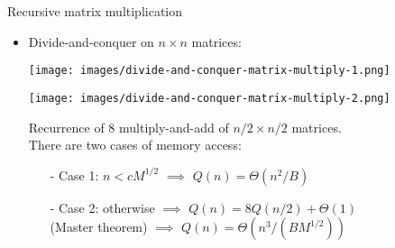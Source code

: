 \documentclass[t,usepdftitle=false]{beamer}
\begin{document}
\begin{frame}{Recursive matrix multiplication}
\begin{itemize}
\item Divide-and-conquer on $n\times n$ matrices:\vspace{.15cm}
\begin{center}\hspace{-1cm}\texttt{[image: images/divide-and-conquer-matrix-multiply-1.png]}\end{center}\vspace{.15cm}
\begin{center}\hspace{2.45cm}\texttt{[image: images/divide-and-conquer-matrix-multiply-2.png]}\end{center}
Recurrence of 8 multiply-and-add of $n/2\times n/2$ matrices.\vspace{.1cm}\\
There are two cases of memory access:
\begin{itemize}\normalsize
\item[-] Case 1: $n<cM^{1/2}$ $\implies$ $Q(n)=\Theta(n^2/B)$\vspace{.1cm}
\item[-] Case 2: otherwise $\implies$ $Q(n)=8Q(n/2)+\Theta(1)$\vspace{.1cm}\\
\hspace{.02cm}(Master theorem) $\implies$ $Q(n)=\Theta(n^3/(BM^{1/2}))$
\end{itemize}
\end{itemize}
\end{frame}
\end{document}
